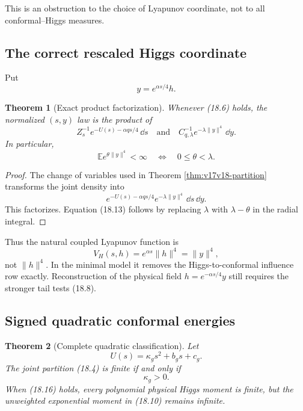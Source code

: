\documentclass[11pt]{article}
\newtheorem{theorem}{Theorem}[section]
\theoremstyle{remark}
\begin{document}
This is an obstruction to the choice of Lyapunov coordinate, not
to all conformal--Higgs measures.

\subsection{The correct rescaled Higgs coordinate}

Put
\[
 y=e^{\alpha s/4}h.                                \tag{18.11}
\]

\begin{theorem}[Exact product factorization]
\label{thm:v17v18-factorization}
Whenever (18.6) holds, the normalized \((s,y)\) law is the product
of
\[
 Z_s^{-1}e^{-U(s)-\alpha q s/4}\,\dd s
 \quad\text{and}\quad
 C_{q,\lambda}^{-1}e^{-\lambda\|y\|^4}\,\dd y.     \tag{18.12}
\]
In particular,
\[
 \mathbb E e^{\theta\|y\|^4}<\infty
 \quad\Longleftrightarrow\quad
 0\leq\theta<\lambda.                              \tag{18.13}
\]
\end{theorem}

\begin{proof}
The change of variables used in Theorem
\ref{thm:v17v18-partition} transforms the joint density into
\[
 e^{-U(s)-\alpha q s/4}e^{-\lambda\|y\|^4}\,\dd s\,\dd y.
\]
This factorizes.  Equation (18.13) follows by replacing
\(\lambda\) with \(\lambda-\theta\) in the radial integral.
\end{proof}

Thus the natural coupled Lyapunov function is
\[
 V_H(s,h)=e^{\alpha s}\|h\|^4=\|y\|^4,             \tag{18.14}
\]
not \(\|h\|^4\).  In the minimal model it removes the
Higgs-to-conformal influence row exactly.  Reconstruction of the
physical field \(h=e^{-\alpha s/4}y\) still requires the stronger
tail tests (18.8).

\subsection{Signed quadratic conformal energies}

\begin{theorem}[Complete quadratic classification]
\label{thm:v17v18-quadratic}
Let
\[
 U(s)=\kappa_gs^2+b_gs+c_g.                        \tag{18.15}
\]
The joint partition (18.4) is finite if and only if
\[
 \kappa_g>0.                                       \tag{18.16}
\]
When (18.16) holds, every polynomial physical Higgs moment is
finite, but the unweighted exponential moment in (18.10) remains
infinite.
\end{theorem}
\end{document}
